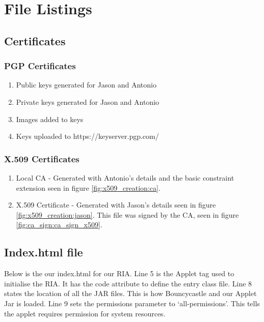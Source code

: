 \pagebreak
\section{File Listings}

\subsection{Certificates}

\subsubsection{PGP Certificates}
\begin{enumerate}
    \item Public keys generated for Jason and Antonio
    \item Private keys generated for Jason and Antonio
    \item Images added to keys
    \item Keys uploaded to https://keyserver.pgp.com/
    
\end{enumerate}

\subsubsection{X.509 Certificates}
\begin{enumerate}
    \item Local CA - Generated with Antonio's details and the basic constraint extension seen in figure \ref{fig:x509_creation:ca}.
    \item X.509 Certificate - Generated with Jason's details seen in figure \ref{fig:x509_creation:jason}. This file was signed by the CA, seen in figure \ref{fig:ca_sign:ca_sign_x509}.
\end{enumerate}




\subsection{Index.html file}
\label{filelisting:index}
Below is the our index.html for our RIA. Line 5 is the Applet tag used to initialise the RIA. It has the code attribute to define the entry class file.
Line 8 states the location of all the JAR files. This is how Bouncycastle and our Applet Jar is loaded.
Line 9 sets the permissions parameter to `all-permissions'. This tells the applet requires permission for system resources.

